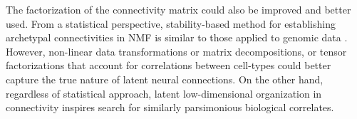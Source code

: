 The factorization of the connectivity matrix could also be improved and better used.
From a statistical perspective, stability-based method for establishing archetypal connectivities in NMF is similar to those applied to genomic data \cite{Wu2016-gg, Kotliar2019-yj}.
However, non-linear data transformations or matrix decompositions, or tensor factorizations that account for correlations between cell-types could better capture the true nature of latent neural connections.
On the other hand, regardless of statistical approach, latent low-dimensional organization in connectivity inspires search for similarly parsimonious biological correlates.

